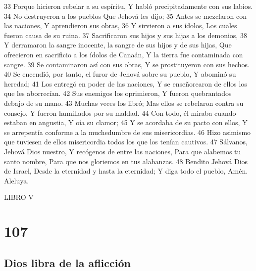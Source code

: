 33 Porque hicieron rebelar a su espíritu,
Y habló precipitadamente con sus labios.
34 No destruyeron a los pueblos
Que Jehová les dijo;
35 Antes se mezclaron con las naciones,
Y aprendieron sus obras,
36 Y sirvieron a sus ídolos,
Los cuales fueron causa de su ruina.
37 Sacrificaron sus hijos y sus hijas a los demonios,
38 Y derramaron la sangre inocente, la sangre de sus hijos y de sus hijas,
Que ofrecieron en sacrificio a los ídolos de Canaán,
Y la tierra fue contaminada con sangre.
39 Se contaminaron así con sus obras,
Y se prostituyeron con sus hechos.
40 Se encendió, por tanto, el furor de Jehová sobre su pueblo,
Y abominó su heredad;
41 Los entregó en poder de las naciones,
Y se enseñorearon de ellos los que les aborrecían.
42 Sus enemigos los oprimieron,
Y fueron quebrantados debajo de su mano.
43 Muchas veces los libró;
Mas ellos se rebelaron contra su consejo,
Y fueron humillados por su maldad.
44 Con todo, él miraba cuando estaban en angustia,
Y oía su clamor;
45 Y se acordaba de su pacto con ellos,
Y se arrepentía conforme a la muchedumbre de sus misericordias.
46 Hizo asimismo que tuviesen de ellos misericordia todos los que los tenían cautivos.
47 Sálvanos, Jehová Dios nuestro,
Y recógenos de entre las naciones,
Para que alabemos tu santo nombre,
Para que nos gloriemos en tus alabanzas.
48 Bendito Jehová Dios de Israel,
Desde la eternidad y hasta la eternidad;
Y diga todo el pueblo, Amén.
Aleluya.


LIBRO V

\chapter{107}

\section*{Dios libra de la aflicción}

